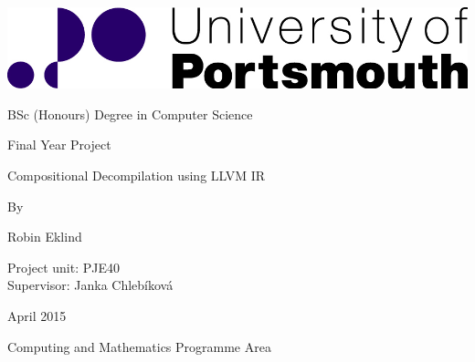 \documentclass[12pt, a4paper]{article}
\begin{document}
\thispagestyle{empty}

\setlength{\parindent}{0pt}

\includegraphics[width=\linewidth]{logo.png}

\sffamily \bfseries

\vspace*{2.5cm}

\fontsize{28pt}{0pt}\selectfont
BSc (Honours) Degree in Computer Science

\vspace*{1.45cm}

\fontsize{20pt}{0pt}\selectfont
Final Year Project

\vspace*{4.77cm}

\fontsize{16pt}{0pt}\selectfont
Compositional Decompilation using LLVM IR

\vspace*{2.13cm}

By

\vspace*{0.86cm}

Robin Eklind

\vspace*{0.86cm}

Project unit: PJE40 \\
Supervisor: Janka Chlebíková

\vspace*{2.4cm}

April 2015

\vfill

\fontsize{14pt}{0pt}\selectfont
Computing and Mathematics Programme Area
\end{document}
